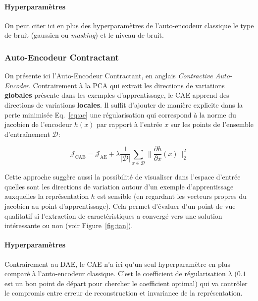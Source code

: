 \paragraph{Hyperparamètres} On peut citer ici en plus des hyperparamètres de
l'auto-encodeur classique le type de bruit (gaussien ou \textit{masking}) et le niveau
de bruit.



\subsubsection{Auto-Encodeur Contractant}

On présente ici l'Auto-Encodeur Contractant, en anglais \textit{Contractive
Auto-Encoder}.
Contrairement à la PCA qui extrait les directions de variations
\textbf{globales} présente dans les exemples d'apprentissage, le CAE apprend
des directions de variations \textbf{locales}. Il suffit d'ajouter de manière
explicite dans la perte minimisée Eq.~\ref{eq:ae} une régularisation qui
correspond à la norme du jacobien de l'encodeur $h(x)$ par rapport à l'entrée
$x$ sur les points de l'ensemble d'entraînement $\mathcal{D}$:

\begin{equation}
\mathcal{J}_\textrm{CAE} = \mathcal{J}_\textrm{AE} + \lambda\frac{1}{\vert \mathcal{D}\vert}\sum_{x\in\mathcal{D}}\| \frac{\partial h}{\partial x}(x)\|_2^2
\label{eq:cae}
\end{equation}

Cette approche suggère aussi la possibilité de visualiser dans l'espace
d'entrée quelles sont les directions de variation autour d'un exemple
d'apprentissage auxquelles la représentation $h$ est sensible  (en regardant
les vecteurs propres du jacobien au point d'apprentissage). Cela permet
d'évaluer d'un point de vue qualitatif si l'extraction de caractéristiques a
convergé vers une solution intéressante ou non (voir Figure~\ref{fig:tan}).

\paragraph{Hyperparamètres} Contrairement au DAE, le CAE n'a ici qu'un seul
hyperparamètre en plus comparé à l'auto-encodeur classique. C'est le
coefficient de régularisation $\lambda$ ($0.1$ est un bon point de départ pour
chercher le coefficient optimal) qui va contrôler le compromis entre
erreur de reconstruction et invariance de la représentation.

